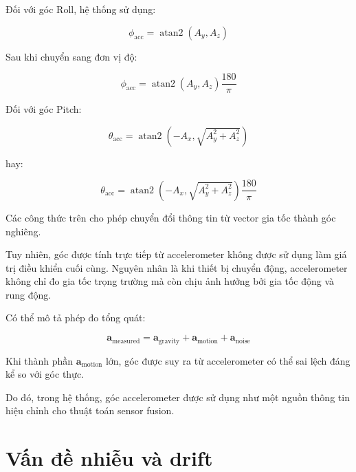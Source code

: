 \documentclass[a4paper,12pt]{report}
\begin{document}
Đối với góc Roll, hệ thống sử dụng:

\begin{equation}
\phi_{\text{acc}}
=
\operatorname{atan2}(A_y,A_z)
\end{equation}

Sau khi chuyển sang đơn vị độ:

\begin{equation}
\phi_{\text{acc}}
=
\operatorname{atan2}(A_y,A_z)
\frac{180}{\pi}
\end{equation}

Đối với góc Pitch:

\begin{equation}
\theta_{\text{acc}}
=
\operatorname{atan2}
\left(
-A_x,
\sqrt{A_y^2 + A_z^2}
\right)
\end{equation}

hay:

\begin{equation}
\theta_{\text{acc}}
=
\operatorname{atan2}
\left(
-A_x,
\sqrt{A_y^2 + A_z^2}
\right)
\frac{180}{\pi}
\end{equation}

Các công thức trên cho phép chuyển đổi thông tin từ vector gia tốc thành góc nghiêng.

Tuy nhiên, góc được tính trực tiếp từ accelerometer không được sử dụng làm giá trị điều khiển cuối cùng. Nguyên nhân là khi thiết bị chuyển động, accelerometer không chỉ đo gia tốc trọng trường mà còn chịu ảnh hưởng bởi gia tốc động và rung động.

Có thể mô tả phép đo tổng quát:

\begin{equation}
\mathbf{a}_{\text{measured}}
=
\mathbf{a}_{\text{gravity}}
+
\mathbf{a}_{\text{motion}}
+
\mathbf{a}_{\text{noise}}
\end{equation}

Khi thành phần $\mathbf{a}_{\text{motion}}$ lớn, góc được suy ra từ accelerometer có thể sai lệch đáng kể so với góc thực.

Do đó, trong hệ thống, góc accelerometer được sử dụng như một nguồn thông tin hiệu chỉnh cho thuật toán sensor fusion.


\section{Vấn đề nhiễu và drift}
\label{sec:noise-drift}
\end{document}
